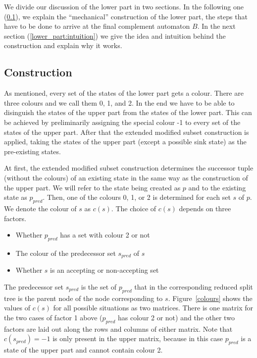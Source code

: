 We divide our discussion of the lower part in two sections. In the following one (\ref{lower_part:steps}), we explain the ``mechanical'' construction of the lower part, the steps that have to be done to arrive at the final complement automaton $B$. In the next section (\ref{lower_part:intuition}) we give the idea and intuition behind the construction and explain why it works.

\subsection{Construction}
\label{lower_part:steps}
As mentioned, every set of the states of the lower part gets a colour. There are three colours and we call them 0, 1, and 2. In the end we have to be able to disinguish the states of the upper part from the states of the lower part. This can be achieved by preliminarily assigning the special colour -1 to every set of the states of the upper part. After that the extended modified subset construction is applied, taking the states of the upper part (except a possible sink state) as the pre-existing states.

At first, the extended modified subset construction determines the successor tuple (without the colours) of an existing state in the same way as the construction of the upper part. We will refer to the state being created as $p$ and to the existing state as $p_{pred}$. Then, one of the colours 0, 1, or 2 is determined for each set $s$ of $p$. We denote the colour of $s$ as $c(s)$. The choice of $c(s)$ depends on three factors.
\begin{itemize}
\item Whether $p_{pred}$ has a set with colour 2 or not
\item The colour of the predecessor set $s_{pred}$ of $s$
\item Whether $s$ is an accepting or non-accepting set
\end{itemize}
The predecessor set $s_{pred}$ is the set of $p_{pred}$ that in the corresponding reduced split tree is the parent node of the node corresponding to $s$. Figure~\ref{colours} shows the values of $c(s)$ for all possible situations as two matrices. There is one matrix for the two cases of factor 1 above ($p_{pred}$ has colour 2 or not) and the other two factors are laid out along the rows and columns of either matrix. Note that $c(s_{pred}) = -1$ is only present in the upper matrix, because in this case $p_{pred}$ is a state of the upper part and cannot contain colour 2.

